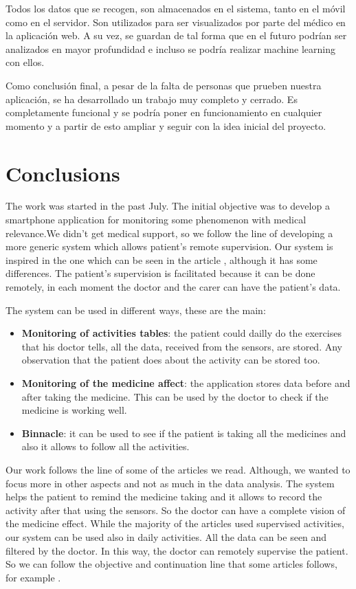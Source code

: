 Todos los datos que se recogen, son almacenados en el sistema, tanto en el móvil como en el servidor. Son utilizados para ser visualizados por parte del médico en la aplicación web. A su vez, se guardan de tal forma que en el futuro podrían ser analizados en mayor profundidad e incluso se podría realizar machine learning con ellos.
\newline

Como conclusión final, a pesar de la falta de personas que prueben nuestra aplicación, se ha desarrollado un trabajo muy completo y cerrado. Es completamente funcional y se podría poner en funcionamiento en cualquier momento y a partir de esto ampliar y seguir con la idea inicial del proyecto.
\newpage

\section{Conclusions}

The work was started in the past July. The initial objective was to develop a smartphone application for monitoring some phenomenon with medical relevance.We didn’t get medical support, so we follow the line of developing a more generic system which allows patient’s remote supervision. Our system is inspired in the one which can be seen in the article \cite{resumen1}, although it has some differences. The patient’s supervision is facilitated because it can be done remotely, in each moment the doctor and the carer can have the patient’s data.
\newline

The system can be used in different ways, these are the main:

\begin{itemize}
	\item {\bf Monitoring of activities tables}: the patient could dailly do the exercises that his doctor tells, all the data, received from the sensors, are stored. Any observation that the patient does about the activity can be stored too.
	\item {\bf Monitoring of the medicine affect}: the application stores data before and after taking the medicine. This can be used by the doctor to check if the medicine is working well.
	\item {\bf Binnacle}: it can be used to see if the patient is taking all the medicines and also it allows to follow all the activities. 
\end{itemize}

Our work follows the line of some of the articles we read. Although, we wanted to focus more in other aspects and not as much in the data analysis. The system helps the patient to remind the medicine taking and it allows to record the activity after that using the sensors. So the doctor can have a complete vision of the medicine effect. While the majority of the articles used supervised activities, our system can be used also in daily activities. All the data can be seen and filtered by the doctor. In this way, the doctor can remotely supervise the patient. So we can follow the objective and continuation line that some articles follows, for example \cite {resumen2}.
\newline

